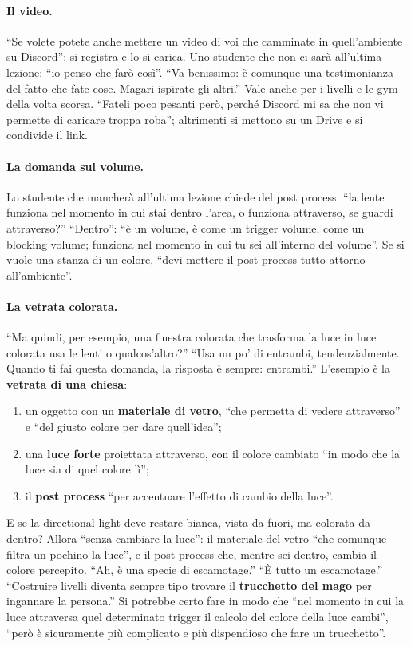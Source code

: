 \paragraph{Il video.} ``Se volete potete anche mettere un video di voi che camminate in
quell'ambiente su Discord'': si registra e lo si carica. Uno studente che non ci sarà
all'ultima lezione: ``io penso che farò così''. ``Va benissimo: è comunque una testimonianza del
fatto che fate cose. Magari ispirate gli altri.'' Vale anche per i livelli e le gym della
volta scorsa. ``Fateli poco pesanti però, perché Discord mi sa che non vi permette di caricare
troppa roba''; altrimenti si mettono su un Drive e si condivide il link.

\paragraph{La domanda sul volume.} Lo studente che mancherà all'ultima lezione chiede del post
process: ``la lente funziona nel momento in cui stai dentro l'area, o funziona attraverso, se
guardi attraverso?'' ``Dentro'': ``è un volume, è come un trigger volume, come un blocking
volume; funziona nel momento in cui tu sei all'interno del volume''. Se si vuole una stanza di
un colore, ``devi mettere il post process tutto attorno all'ambiente''.

\paragraph{La vetrata colorata.} ``Ma quindi, per esempio, una finestra colorata che trasforma
la luce in luce colorata usa le lenti o qualcos'altro?'' ``Usa un po' di entrambi,
tendenzialmente. Quando ti fai questa domanda, la risposta è sempre: entrambi.'' L'esempio è la
\textbf{vetrata di una chiesa}:
\begin{enumerate}
  \item un oggetto con un \textbf{materiale di vetro}, ``che permetta di vedere attraverso'' e
        ``del giusto colore per dare quell'idea'';
  \item una \textbf{luce forte} proiettata attraverso, con il colore cambiato ``in modo che la
        luce sia di quel colore lì'';
  \item il \textbf{post process} ``per accentuare l'effetto di cambio della luce''.
\end{enumerate}
E se la directional light deve restare bianca, vista da fuori, ma colorata da dentro? Allora
``senza cambiare la luce'': il materiale del vetro ``che comunque filtra un pochino la luce'', e
il post process che, mentre sei dentro, cambia il colore percepito. ``Ah, è una specie di
escamotage.'' ``È tutto un escamotage.'' ``Costruire livelli diventa sempre tipo trovare il
\textbf{trucchetto del mago} per ingannare la persona.'' Si potrebbe certo fare in modo che
``nel momento in cui la luce attraversa quel determinato trigger il calcolo del colore della
luce cambi'', ``però è sicuramente più complicato e più dispendioso che fare un trucchetto''.

